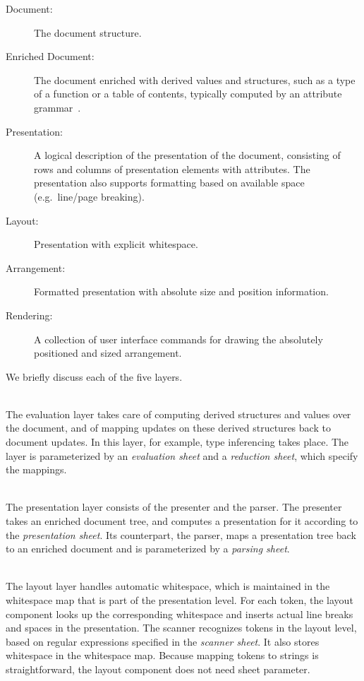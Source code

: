 \documentclass[12pt]{article}
\begin{document}
\begin{description}
\item[Document:] The document structure.

\item[Enriched Document:] The document enriched with derived values and structures, such as a type of a function or a table of contents, typically computed by an attribute grammar~\cite{reps84synGen}.

\item[Presentation:] A logical description of the presentation of the document, consisting of rows and columns of presentation elements with attributes. The presentation also supports formatting based on available space (e.g.\ line/page breaking).

\item[Layout:]  Presentation with explicit whitespace.

\item[Arrangement:] Formatted presentation with absolute size and position information.

\item[Rendering:] A collection of user interface commands for drawing the absolutely positioned and sized arrangement.
\end{description}

We briefly discuss each of the five layers.

\\
The evaluation layer takes care of computing derived structures and values over the document, and of mapping updates on these derived structures back to document updates. In this layer, for example, type inferencing takes place. The layer is parameterized by an {\em evaluation sheet} and a {\em reduction sheet}, which specify the mappings. 

\\
The presentation layer consists of the presenter and the parser. The presenter takes an enriched document tree, and computes a presentation for it according to the {\em presentation sheet}. Its counterpart, the parser, maps a presentation tree back to an enriched document and is parameterized by a {\em parsing sheet}.

\\
The layout layer handles automatic whitespace, which is maintained in the whitespace map that is part of the presentation level. For each token, the layout component looks up the corresponding whitespace and inserts actual line breaks and spaces in the presentation. The scanner recognizes tokens in the layout level, based on regular expressions specified in the {\em scanner sheet}. It also stores whitespace in the whitespace map. Because mapping tokens to strings is straightforward, the layout component does not need sheet parameter.
\end{document}
